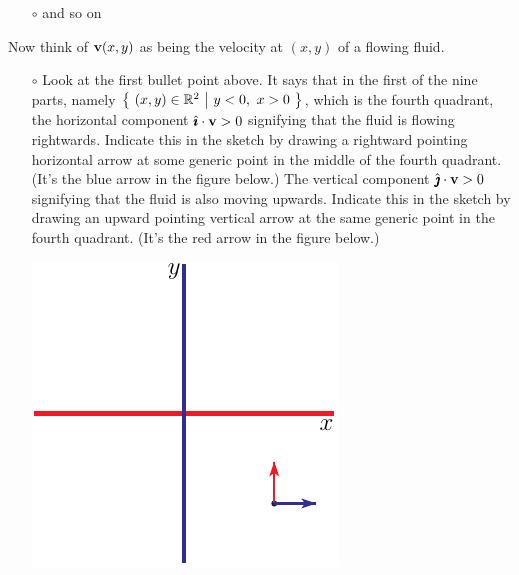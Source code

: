 \begin{eg}
\begin{itemize}
\item[$\circ$] 
and so on
\end{itemize}
Now think of $\mathbf{v}(x,y)$ as being the velocity at $(x,y)$ of a flowing fluid.
\begin{itemize}%
\item[$\circ$]
Look at the first bullet point above. It says that in the first of the nine 
parts, namely $\big\{\ (x,y)\in\bbbr^2\ \big|\  y<0,\ x>0\ \big\}$,
which is the fourth quadrant, 
the horizontal component  $\hat{\pmb{\imath}}\cdot\mathbf{v}>0$ signifying that the fluid is flowing
rightwards. Indicate this in the sketch by drawing a rightward pointing 
horizontal arrow at some generic point in the middle of the fourth quadrant. 
(It's the blue arrow in the figure below.)
The vertical component  $\hat{\pmb{\jmath}}\cdot\mathbf{v}>0$ signifying that the fluid is 
also moving upwards. Indicate this in the sketch by drawing an upward 
pointing vertical arrow at the same generic point in the fourth quadrant.
(It's the red arrow in the figure below.)
\begin{efig}
\begin{center}
    \includegraphics{phaseVortex4.pdf}
\end{center}
\end{efig}



\end{itemize}
\end{eg}
